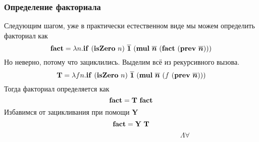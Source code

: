 \documentclass{beamer}
\newcommand{\mmterm}[1]{\text{\textbf{#1}}}
\newcommand{\mmif}{\mmterm{if}}
\newcommand{\mmchurchn}[1]{\boldsymbol{\overline{#1}}}
\begin{document}
\begin{frame}\frametitle{Определение факториала}
    
Следующим шагом, уже в практически естественном виде мы можем определить факториал как
\[\mmterm{fact} = \lambda n. \mmif\ (\mmterm{isZero}\ n)\ \mmchurchn{1}\ (\mmterm{mul}\ \mmchurchn{n}\ (\mmterm{fact}\ (\mmterm{prev}\ \mmchurchn{n})))\]
Но неверно, потому что зациклились.
Выделим всё из рекурсивного вызова.
\[\mmterm{T} = \lambda fn. \mmif\ (\mmterm{isZero}\ n)\ \mmchurchn{1}\ (\mmterm{mul}\ \mmchurchn{n}\ (f\ (\mmterm{prev}\ \mmchurchn{n})))\]
Тогда факториал определяется как
\[\mmterm{fact} = \mmterm{T}\ \mmterm{fact}\]
Избавимся от зацикливания при помощи \textbf{Y}
\[\mmterm{fact} = \mmterm{Y}\ \mmterm{T}\]
\begin{align*}
  & & & & & & & & & & & & & & & & & & &\Lambda \forall
\end{align*}
\end{frame}
\end{document}
